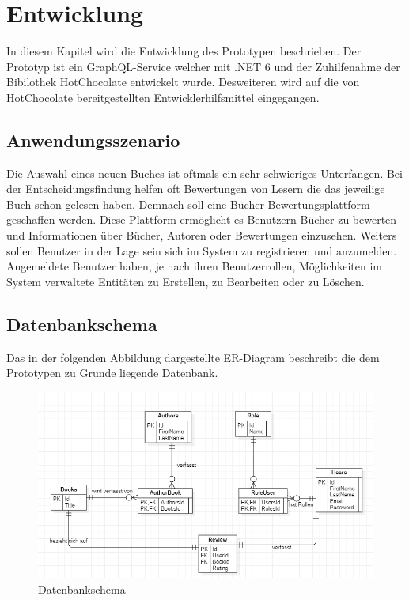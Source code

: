 \chapter{Entwicklung}
In diesem Kapitel wird die Entwicklung des Prototypen beschrieben.
Der Prototyp ist ein GraphQL-Service welcher mit .NET 6 und der Zuhilfenahme der Bibilothek HotChocolate entwickelt wurde.
Desweiteren wird auf die von HotChocolate bereitgestellten Entwicklerhilfsmittel eingegangen.


\section{Anwendungsszenario}
Die Auswahl eines neuen Buches ist oftmals ein sehr schwieriges Unterfangen.
Bei der Entscheidungsfindung helfen oft Bewertungen von Lesern die das jeweilige Buch schon gelesen haben.
Demnach soll eine Bücher-Bewertungsplattform geschaffen werden.
Diese Plattform ermöglicht es Benutzern Bücher zu bewerten und Informationen über Bücher, Autoren oder Bewertungen einzusehen.
Weiters sollen Benutzer in der Lage sein sich im System zu registrieren und anzumelden.
Angemeldete Benutzer haben, je nach ihren Benutzerrollen, Möglichkeiten im System verwaltete Entitäten zu Erstellen, zu Bearbeiten oder zu Löschen.

\section{Datenbankschema}
Das in der folgenden Abbildung dargestellte ER-Diagram beschreibt die dem Prototypen zu Grunde liegende Datenbank.

\begin{figure}[H]
    \includegraphics[width=\textwidth]{pics/ER-Diagram.png}
    \caption{Datenbankschema}
\end{figure}


